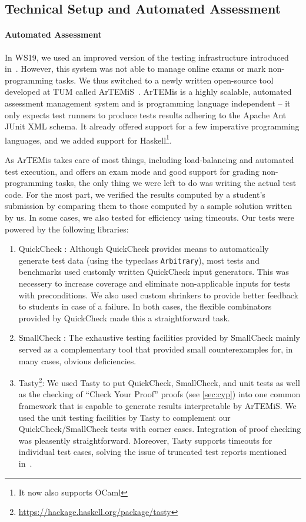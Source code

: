 \subsection{Technical Setup and Automated Assessment}\label{sec:tech_setup_test}

\paragraph{Automated Assessment}
In WS19, we used an improved version of
the testing infrastructure introduced in~\cite{next_1100}.
However, this system was not able to manage online exams or mark non-programming tasks.
We thus switched to a newly written open-source
tool developed at TUM called ArTEMiS~\cite{artemis}.
ArTEMis is a highly scalable, automated assessment management system and is programming language independent --
it only expects test runners to produce tests results
adhering to the Apache Ant JUnit XML schema.
It already offered support for a few imperative programming languages,
and we added support for Haskell\footnote{It now also supports OCaml}.

As ArTEMis takes care of most things,
including load-balancing and automated test execution,
and offers an exam mode and good support for grading non-programming tasks,
the only thing we were left to do was writing the actual test code.
For the most part, we verified the results computed
by a student's submission by comparing them to those
computed by a sample solution written by us.
In some cases, we also tested for efficiency using timeouts.
Our tests were powered by the following libraries:
\begin{enumerate}
  \item QuickCheck \cite{quickcheck}:
  Although QuickCheck provides means to automatically generate test data (using the typeclass \lstinline!Arbitrary!),
  most tests and benchmarks used customly written QuickCheck input generators.
  This was necessery to increase coverage and eliminate non-applicable inputs for tests with preconditions.
  We also used custom shrinkers to provide better feedback to students in case of a failure.
  In both cases, the flexible combinators provided by QuickCheck made this a straightforward task.
  \item SmallCheck \cite{smallcheck}: The exhaustive testing facilities provided by SmallCheck mainly served
    as a complementary tool that provided small counterexamples for, in many cases, obvious deficiencies.
  \item Tasty\footnote{\url{https://hackage.haskell.org/package/tasty}}: We used Tasty to put QuickCheck, SmallCheck, and unit tests as well as the checking of ``Check Your Proof'' proofs (see \cref{sec:cyp}) into one common framework that is capable to generate results interpretable by ArTEMiS.
  We used the unit testing facilities by Tasty to complement our QuickCheck/SmallCheck tests with corner cases.
  Integration of proof checking was pleasently straightforward.
  Moreover, Tasty supports timeouts for individual test cases,
  solving the issue of truncated test reports mentioned in~\cite{next_1100}.
\end{enumerate}

